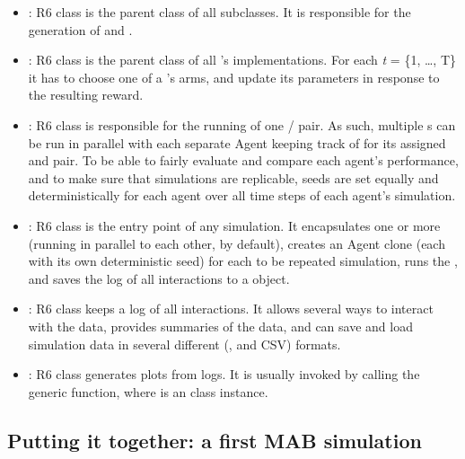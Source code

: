 \documentclass{jss}
\begin{document}
\begin{itemize}
         \item {}: R6 class  is the parent class of all   subclasses. It is responsible for the generation of  and .

         \item {}: R6 class  is the parent class of all 's  implementations. For each \emph{t} = \{1, \ldots, T\} it has to choose one of a 's  arms, and update its parameters  in response to the resulting reward.

         \item {}: R6 class  is responsible for the running of one / pair. As such, multiple s can be run in parallel with each separate Agent keeping track of  for its assigned  and  pair. To be able to fairly evaluate and compare each agent's performance, and to make sure that simulations are replicable, seeds are set equally and deterministically for each agent over all  time steps of each agent's simulation.

         \item {}: R6 class  is the entry point of any  simulation. It encapsulates one or more  (running in parallel to each other, by default), creates an Agent clone (each with its own deterministic seed) for each to be repeated simulation, runs the , and saves the log of all  interactions to a  object.

         \item {}: R6 class  keeps a log of all  interactions. It allows several ways to interact with the data, provides summaries of the data, and can save and load simulation data in several different (,  and CSV) formats.

         \item {}: R6 class  generates plots from  logs. It is usually invoked by calling the generic  function, where  is an  class instance.
\end{itemize}

\subsection{Putting it together: a first MAB simulation}
\end{document}
